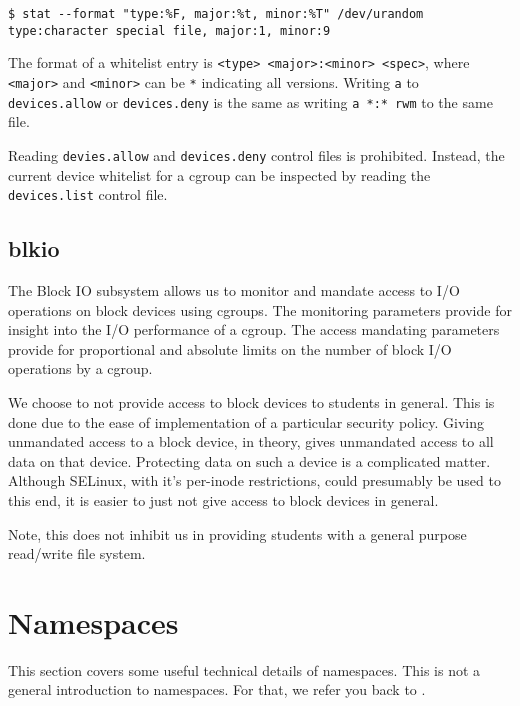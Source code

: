 \begin{lstlisting}
$ stat --format "type:%F, major:%t, minor:%T" /dev/urandom 
type:character special file, major:1, minor:9
\end{lstlisting}

The format of a whitelist entry is \texttt{<type> <major>:<minor> <spec>},
where \texttt{<major>} and \texttt{<minor>} can be \texttt{*} indicating all
versions. Writing \texttt{a} to \texttt{devices.allow} or \texttt{devices.deny}
is the same as writing \texttt{a *:* rwm} to the same file.

Reading \texttt{devies.allow} and \texttt{devices.deny} control files is
prohibited. Instead, the current device whitelist for a cgroup can be inspected
by reading the \texttt{devices.list} control file.

\subsection{blkio}

The Block IO subsystem allows us to monitor and mandate access to I/O
operations on block devices using cgroups\cite{blkio-controller.txt}. The
monitoring parameters provide for insight into the I/O performance of a cgroup.
The access mandating parameters provide for proportional and absolute limits on
the number of block I/O operations by a cgroup.

We choose to not provide access to block devices to students in general. This
is done due to the ease of implementation of a particular security policy.
Giving unmandated access to a block device, in theory, gives unmandated access
to all data on that device. Protecting data on such a device is a complicated
matter. Although SELinux, with it's per-inode restrictions, could presumably be
used to this end, it is easier to just not give access to block devices in
general.

Note, this does not inhibit us in providing students with a general purpose
read/write file system.

\section{Namespaces}

\label{appendix:namespaces}

This section covers some useful technical details of namespaces. This
is not a general introduction to namespaces. For that, we refer you back to
.

